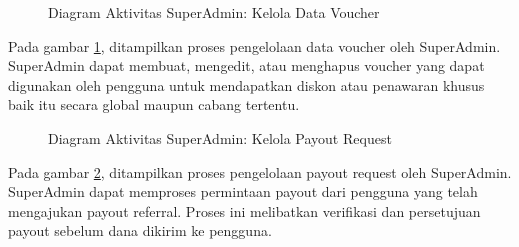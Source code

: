 \begin{figure}[H] %
    \centering
    \caption{Diagram Aktivitas SuperAdmin: Kelola Data Voucher}
    \label{fig:ad_superadmin_voucher} %
\end{figure}

Pada gambar \ref{fig:ad_superadmin_voucher}, ditampilkan proses pengelolaan data voucher oleh SuperAdmin. SuperAdmin dapat membuat, mengedit, atau menghapus voucher yang dapat digunakan oleh pengguna untuk mendapatkan diskon atau penawaran khusus baik itu secara global maupun cabang tertentu.

\begin{figure}[H] %
    \centering
    \caption{Diagram Aktivitas SuperAdmin: Kelola Payout Request}
    \label{fig:ad_superadmin_payout} %
\end{figure}

Pada gambar \ref{fig:ad_superadmin_payout}, ditampilkan proses pengelolaan payout request oleh SuperAdmin. SuperAdmin dapat memproses permintaan payout dari pengguna yang telah mengajukan payout referral. Proses ini melibatkan verifikasi dan persetujuan payout sebelum dana dikirim ke pengguna.